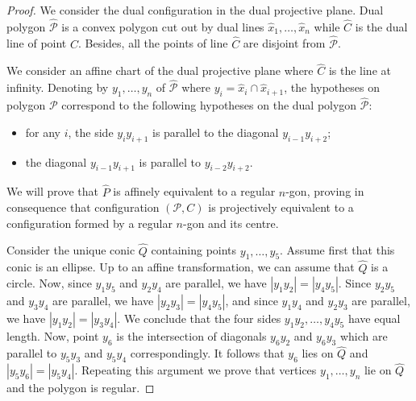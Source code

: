 \documentclass[a4paper,11pt,reqno]{amsart}
\theoremstyle{definition}
\theoremstyle{remark}
\theoremstyle{definition}
\theoremstyle{definition}
\theoremstyle{definition}
\numberwithin{equation}{section}
\begin{document}
\begin{proof}
We consider the dual configuration in the dual projective plane. Dual polygon $\widehat{\mathcal{P}}$ is a convex polygon cut out by dual lines $\hat{x}_{1},\ldots, \hat{x}_{n}$ while $\widehat{C}$ is the dual line of point $C$. Besides, all the points of line $\widehat{C}$ are disjoint from $\widehat{\mathcal{P}}$.
\par
We consider an affine chart of the dual projective plane where $\widehat{C}$ is the line at infinity. Denoting by $y_{1},\ldots, y_{n}$ of $\widehat{\mathcal{P}}$ where $y_{i}=\hat{x}_{i} \cap \hat{x}_{i+1}$, the hypotheses on polygon $\mathcal{P}$ correspond to the following hypotheses on the dual polygon $\widehat{\mathcal{P}}$:
\begin{itemize}
    \item for any $i$, the side $y_iy_{i+1}$ is parallel to the diagonal $y_{i-1}y_{i+2}$;
    \item the diagonal $y_{i-1}y_{i+1}$ is parallel to $y_{i-2}y_{i+2}$.
\end{itemize}
We will prove that $\widehat P$ is affinely equivalent to a regular $n$-gon, proving in consequence that configuration $(\mathcal{P},C)$ is projectively equivalent to a configuration formed by a regular $n$-gon and its centre.
\par
Consider the unique conic $\widehat{Q}$ containing points $y_1,\ldots, y_5$. Assume first that this conic is an ellipse. Up to an affine transformation, we can assume that $\widehat{Q}$ is a circle. Now, since $y_1y_5$ and $y_2y_4$ are parallel, we have $|y_1y_2|=|y_4y_5|$. Since $y_2y_5$ and $y_3y_4$ are parallel, we have $|y_2y_3|=|y_4y_5|$, and  since $y_1y_4$ and $y_2y_3$ are parallel, we have $|y_1y_2|=|y_3y_4|$. We conclude that the four sides $y_1y_2,\ldots, y_4y_5$ have equal length. Now, point $y_6$ is the intersection of diagonals $y_6y_2$ and $y_6y_3$ which are parallel to $y_5y_3$ and $y_5y_4$ correspondingly. It follows that $y_6$ lies on $\widehat{Q}$ and $|y_5y_6|=|y_5y_4|$. Repeating this argument we prove that vertices $y_1,\ldots,y_{n}$ lie on $\widehat{Q}$ and the polygon is regular.
\par

\end{proof}
\end{document}
